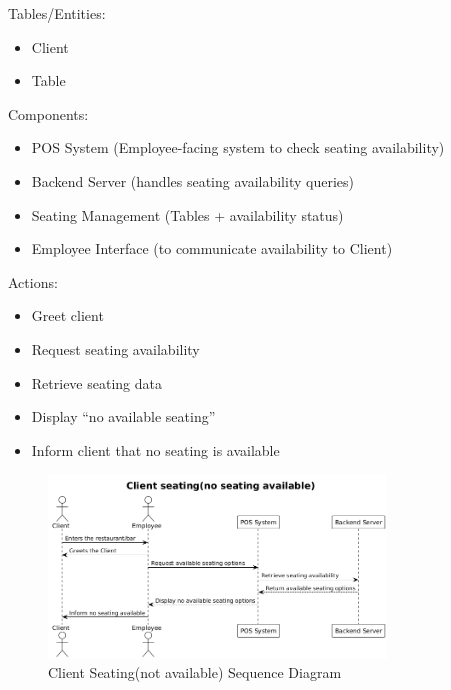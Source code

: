 \documentclass[]{VUMIFTemplateClass}
\begin{document}
Tables/Entities:
\begin{itemize}
\setlength{\itemsep}{2pt}
\setlength{\parskip}{0pt}
\setlength{\parsep}{0pt}
\item Client
\item Table
\end{itemize}

Components:
\begin{itemize}
\setlength{\itemsep}{2pt}
\setlength{\parskip}{0pt}
\setlength{\parsep}{0pt}
\item POS System (Employee-facing system to check seating availability)
\item Backend Server (handles seating availability queries)
\item Seating Management (Tables + availability status)
\item Employee Interface (to communicate availability to Client)
\end{itemize}

Actions:
\begin{itemize}
\setlength{\itemsep}{2pt}
\setlength{\parskip}{0pt}
\setlength{\parsep}{0pt}
\item Greet client
\item Request seating availability
\item Retrieve seating data
\item Display “no available seating”
\item Inform client that no seating is available
\end{itemize}

\begin{figure}[H]
    \centering
    \includegraphics[width=0.8\textwidth]{docs/ps-design/design-document/images/diagrams/services/order_client_seating_not_available_sequence.png}
    \caption{Client Seating(not available) Sequence Diagram}
    \label{fig:client_seating_not_available_sequence}
\end{figure}
\end{document}
